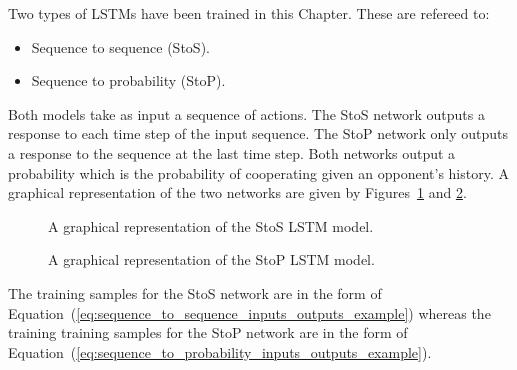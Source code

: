 Two types of LSTMs have been trained in this Chapter. These are refereed to:

\begin{itemize}
    \item Sequence to sequence (StoS).
    \item Sequence to probability (StoP).
\end{itemize}

Both models take as input a sequence of actions. The StoS network outputs a
response to each time step of the input sequence. The StoP network only outputs
a response to the sequence at the last time step. Both networks output a
probability which is the probability of cooperating given an opponent's history.
A graphical representation of the two networks are given by
Figures~\ref{fig:sequence_to_sequence} and \ref{fig:sequence_to_probability}.

\begin{figure}[!htbp]
    \centering
    
    \caption{A graphical representation of the StoS LSTM model.}\label{fig:sequence_to_sequence}
\end{figure}

\begin{figure}[!htbp]
    \centering
    
    \caption{A graphical representation of the StoP LSTM model.}\label{fig:sequence_to_probability}
\end{figure}

The training samples for the StoS network are in the form of
Equation~(\ref{eq:sequence_to_sequence_inputs_outputs_example}) whereas the
training training samples for the StoP network are in the form of
Equation~(\ref{eq:sequence_to_probability_inputs_outputs_example}).

